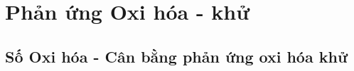 \newenvironment{cacbuoc}{\begin{enumerate}[label= \color{\maunhan}\bfseries\fontfamily{qag}\selectfont{\faAdjust\;Bước \arabic*:},itemsep=0pt,wide=0cm,leftmargin=0.5cm,topsep=0pt]
	}{\end{enumerate}}
\renewcommand{\thesubsubsection}{\Roman{subsubsection}}
\titlespacing*{\subsection}{3pt}{0pt}{-5pt}
\titlespacing*{\subsubsection}{3pt}{5pt}{-5pt}
\titlespacing*{\paragraph}{0cm}{0cm}{-5pt}
\setcounter{chapter}{3}
\chapter{Phản ứng Oxi hóa - khử}
\section{Số Oxi hóa - Cân bằng phản ứng oxi hóa khử}
